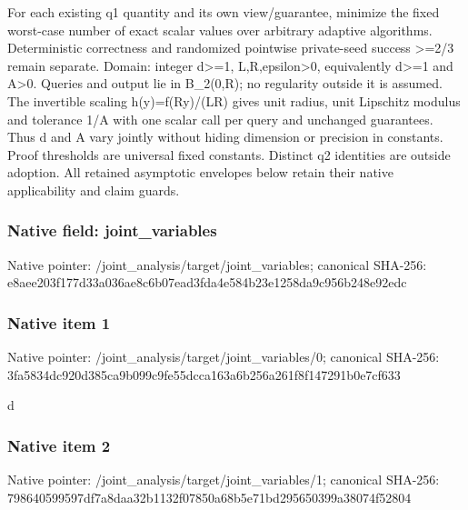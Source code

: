 \documentclass[10pt,a4paper]{article}
\begin{document}
\begingroup\raggedright\sloppy For each existing q1 quantity and its own view/\allowbreak{}guarantee,\allowbreak{} minimize the fixed worst-case number of exact scalar values over arbitrary adaptive algorithms. Deterministic correctness and randomized pointwise private-seed success >=\allowbreak{}2/\allowbreak{}3 remain separate. Domain:\allowbreak{} integer d>=\allowbreak{}1,\allowbreak{} L,\allowbreak{}R,\allowbreak{}epsilon>0,\allowbreak{} equivalently d>=\allowbreak{}1 and A>0. Queries and output lie in B\_\allowbreak{}2(0,\allowbreak{}R);\allowbreak{} no regularity outside it is assumed. The invertible scaling h(y)=\allowbreak{}f(Ry)/\allowbreak{}(LR) gives unit radius,\allowbreak{} unit Lipschitz modulus and tolerance 1/\allowbreak{}A with one scalar call per query and unchanged guarantees. Thus d and A vary jointly without hiding dimension or precision in constants. Proof thresholds are universal fixed constants. Distinct q2 identities are outside adoption. All retained asymptotic envelopes below retain their native applicability and claim guards.\par\endgroup

\subsubsection{Native field: joint\_\allowbreak{}variables}
Native pointer: /joint\_\allowbreak{}analysis/target/joint\_\allowbreak{}variables; canonical SHA-256: e8aee203f177d33a036ae8c6b07ead3fda4e584b23e1258da9c956b248e92edc

\subsubsection{Native item 1}
Native pointer: /joint\_\allowbreak{}analysis/target/joint\_\allowbreak{}variables/0; canonical SHA-256: 3fa5834dc920d385ca9b099c9fe55dcca163a6b256a261f8f147291b0e7cf633

\begingroup\raggedright\sloppy d\par\endgroup

\subsubsection{Native item 2}
Native pointer: /joint\_\allowbreak{}analysis/target/joint\_\allowbreak{}variables/1; canonical SHA-256: 798640599597df7a8daa32b1132f07850a68b5e71bd295650399a38074f52804
\end{document}
